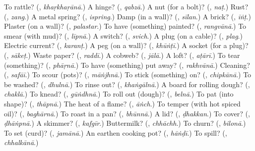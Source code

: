 \begin{tcolorbox}[breakable,colback=teal!4,colframe=teal!35!black,title={Before you move on}]
To rattle? (\textbf{}, \emph{khaṛkhaṛānā}.) A hinge? (\textbf{}, \emph{qabzā}.) A nut (for a bolt)? (\textbf{}, \emph{naṭ}.) Rust? (\textbf{}, \emph{zang}.) A metal spring? (\textbf{}, \emph{ispring}.) Damp (in a wall)? (\textbf{}, \emph{sīlan}.) A brick? (\textbf{}, \emph{īṅṭ}.) Plaster (on a wall)? (\textbf{}, \emph{palastar}.) To have (something) painted? (\textbf{}, \emph{rangvānā}.) To smear (with mud)? (\textbf{}, \emph{līpnā}.) A switch? (\textbf{}, \emph{svich}.) A plug (on a cable)? (\textbf{}, \emph{plag}.) Electric current? (\textbf{}, \emph{karanṭ}.) A peg (on a wall)? (\textbf{}, \emph{khūṅṭī}.) A socket (for a plug)? (\textbf{}, \emph{sākeṭ}.) Waste paper? (\textbf{}, \emph{raddī}.) A cobweb? (\textbf{}, \emph{jālā}.) A loft? (\textbf{}, \emph{aṭārī}.) To tear (something)? (\textbf{}, \emph{phāṛnā}.) To have (something) put away? (\textbf{}, \emph{rakhvānā}.) Cleaning? (\textbf{}, \emph{safāī}.) To scour (pots)? (\textbf{}, \emph{māṅjhnā}.) To stick (something) on? (\textbf{}, \emph{chipkānā}.) To be washed? (\textbf{}, \emph{dhulnā}.) To rinse out? (\textbf{}, \emph{khaṅgālnā}.) A board for rolling dough? (\textbf{}, \emph{chaklā}.) To knead? (\textbf{}, \emph{gūṅdhnā}.) To roll out (dough)? (\textbf{}, \emph{belnā}.) To pat (into shape)? (\textbf{}, \emph{thāpnā}.) The heat of a flame? (\textbf{}, \emph{āṅch}.) To temper (with hot spiced oil)? (\textbf{}, \emph{baghārnā}.) To roast in a pan? (\textbf{}, \emph{bhūnnā}.) A lid? (\textbf{}, \emph{ḍhakkan}.) To cover? (\textbf{}, \emph{ḍhāṅpnā}.) A skimmer? (\textbf{}, \emph{kafgīr}.) Buttermilk? (\textbf{}, \emph{chhāchh}.) To churn? (\textbf{}, \emph{bilonā}.) To set (curd)? (\textbf{}, \emph{jamānā}.) An earthen cooking pot? (\textbf{}, \emph{hāṅḍī}.) To spill? (\textbf{}, \emph{chhalkānā}.)
\end{tcolorbox}
